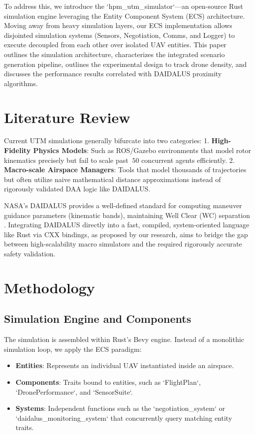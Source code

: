 \documentclass[conference]{IEEEtran}
\begin{document}
To address this, we introduce the `hpm\_utm\_simulator`—an open-source Rust simulation engine leveraging the Entity Component System (ECS) architecture. Moving away from heavy simulation layers, our ECS implementation allows disjointed simulation systems (Sensors, Negotiation, Comms, and Logger) to execute decoupled from each other over isolated UAV entities. This paper outlines the simulation architecture, characterizes the integrated scenario generation pipeline, outlines the experimental design to track drone density, and discusses the performance results correlated with DAIDALUS proximity algorithms.

\section{Literature Review}
Current UTM simulations generally bifurcate into two categories:
1. \textbf{High-Fidelity Physics Models}: Such as ROS/Gazebo environments that model rotor kinematics precisely but fail to scale past $~50$ concurrent agents efficiently.
2. \textbf{Macro-scale Airspace Managers}: Tools that model thousands of trajectories but often utilize naive mathematical distance approximations instead of rigorously validated DAA logic like DAIDALUS.

NASA's DAIDALUS provides a well-defined standard for computing maneuver guidance parameters (kinematic bands), maintaining Well Clear (WC) separation \cite{munoz2015daidalus}. Integrating DAIDALUS directly into a fast, compiled, system-oriented language like Rust via CXX bindings, as proposed by our research, aims to bridge the gap between high-scalability macro simulators and the required rigorously accurate safety validation.

\section{Methodology}

\subsection{Simulation Engine and Components}
The simulation is assembled within Rust's Bevy engine. Instead of a monolithic simulation loop, we apply the ECS paradigm:
\begin{itemize}
    \item \textbf{Entities}: Represents an individual UAV instantiated inside an airspace.
    \item \textbf{Components}: Traits bound to entities, such as `FlightPlan`, `DronePerformance`, and `SensorSuite`.
    \item \textbf{Systems}: Independent functions such as the `negotiation\_system` or `daidalus\_monitoring\_system` that concurrently query matching entity traits.
\end{itemize}
\end{document}

